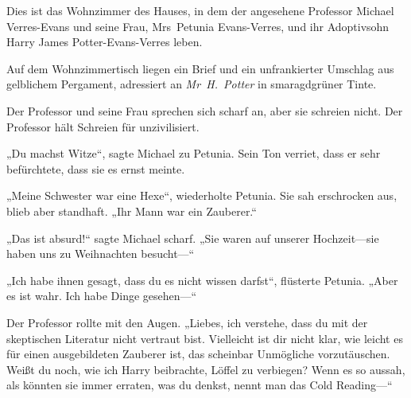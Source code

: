 Dies ist das Wohnzimmer des Hauses, in dem der angesehene Professor Michael Verres-Evans und seine Frau, Mrs~Petunia Evans-Verres, und ihr Adoptivsohn Harry James Potter-Evans-Verres leben.

Auf dem Wohnzimmertisch liegen ein Brief und ein unfrankierter Umschlag aus gelblichem Pergament, adressiert an \emph{Mr~H.~Potter} in smaragdgrüner Tinte.

Der Professor und seine Frau sprechen sich scharf an, aber sie schreien nicht. Der Professor hält Schreien für unzivilisiert.

„Du machst Witze“, sagte Michael zu Petunia. Sein Ton verriet, dass er sehr befürchtete, dass sie es ernst meinte.

„Meine Schwester war eine Hexe“, wiederholte Petunia. Sie sah erschrocken aus, blieb aber standhaft. „Ihr Mann war ein Zauberer.“

„Das ist absurd!“ sagte Michael scharf. „Sie waren auf unserer Hochzeit—sie haben uns zu Weihnachten besucht—“

„Ich habe ihnen gesagt, dass du es nicht wissen darfst“, flüsterte Petunia. „Aber es ist wahr. Ich habe Dinge gesehen—“

Der Professor rollte mit den Augen. „Liebes, ich verstehe, dass du mit der skeptischen Literatur nicht vertraut bist. Vielleicht ist dir nicht klar, wie leicht es für einen ausgebildeten Zauberer ist, das scheinbar Unmögliche vorzutäuschen. Weißt du noch, wie ich Harry beibrachte, Löffel zu verbiegen? Wenn es so aussah, als könnten sie immer erraten, was du denkst, nennt man das Cold Reading—“


